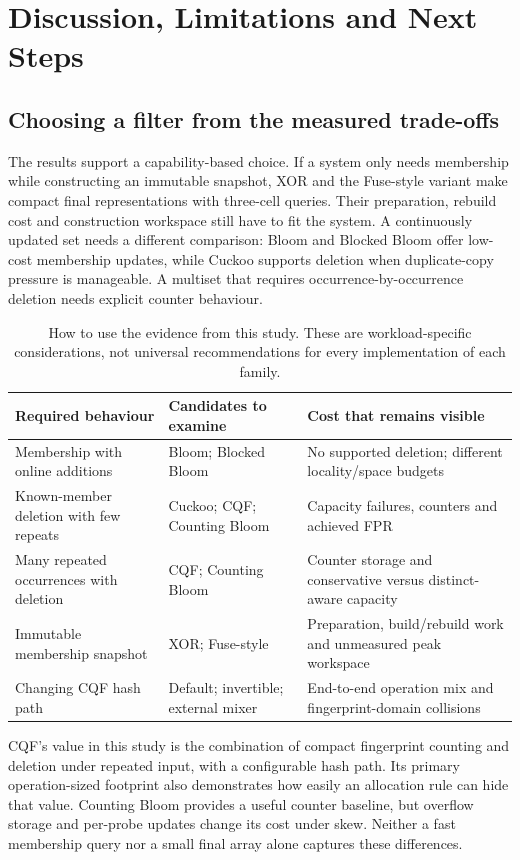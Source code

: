\section{Discussion, Limitations and Next Steps}
\subsection{Choosing a filter from the measured trade-offs}
The results support a capability-based choice. If a system only needs membership while constructing an immutable snapshot, XOR and the Fuse-style variant make compact final representations with three-cell queries. Their preparation, rebuild cost and construction workspace still have to fit the system. A continuously updated set needs a different comparison: Bloom and Blocked Bloom offer low-cost membership updates, while Cuckoo supports deletion when duplicate-copy pressure is manageable. A multiset that requires occurrence-by-occurrence deletion needs explicit counter behaviour.

\begin{table}[!htbp]\centering\small
\caption{How to use the evidence from this study. These are workload-specific considerations, not universal recommendations for every implementation of each family.}
\label{tab:selection}
\begin{tabular}{L{4.0cm}L{4.2cm}L{4.4cm}}\toprule
\textbf{Required behaviour}&\textbf{Candidates to examine}&\textbf{Cost that remains visible}\\\midrule
Membership with online additions&Bloom; Blocked Bloom&No supported deletion; different locality/space budgets\\
Known-member deletion with few repeats&Cuckoo; CQF; Counting Bloom&Capacity failures, counters and achieved FPR\\
Many repeated occurrences with deletion&CQF; Counting Bloom&Counter storage and conservative versus distinct-aware capacity\\
Immutable membership snapshot&XOR; Fuse-style&Preparation, build/rebuild work and unmeasured peak workspace\\
Changing CQF hash path&Default; invertible; external mixer&End-to-end operation mix and fingerprint-domain collisions\\\bottomrule
\end{tabular}
\end{table}

CQF's value in this study is the combination of compact fingerprint counting and deletion under repeated input, with a configurable hash path. Its primary operation-sized footprint also demonstrates how easily an allocation rule can hide that value. Counting Bloom provides a useful counter baseline, but overflow storage and per-probe updates change its cost under skew. Neither a fast membership query nor a small final array alone captures these differences.

